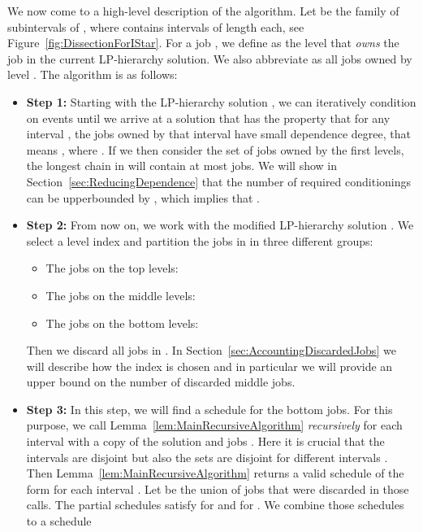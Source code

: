 \documentclass[11pt,letterpaper,oneside,english]{article}
\theoremstyle{theorem}
\begin{document}
We now come to a high-level description of the algorithm. 
Let  be the family of
subintervals of , where  contains  intervals of length 
each, see Figure~\ref{fig:DissectionForIStar}. 
For a job , we define  as the level that \emph{owns} the job in the current LP-hierarchy solution. 
We also abbreviate  as 
all jobs owned by level . The algorithm is as follows:
\begin{itemize}
\item {\bf Step 1:} Starting with the LP-hierarchy solution , we can iteratively condition on events 
until we arrive at a solution 
that has the property that for any interval , the jobs owned by that interval have small dependence degree, that means , where .
If we then consider the set of jobs  
owned by the first  levels, the longest chain in  will contain at most  jobs.
We will show in Section~\ref{sec:ReducingDependence} that the number of required conditionings can be upperbounded by , 
which implies that . \item {\bf Step 2:} From now on, we work with the modified LP-hierarchy solution . We select a 
level index  and partition the jobs in  in three different groups: 
  \begin{itemize}
  \item The jobs on the top levels: 
  \item The jobs on the  middle levels: 
  \item The jobs on the bottom levels: 
  \end{itemize}
Then we discard all jobs in . In Section~\ref{sec:AccountingDiscardedJobs} we will describe how the
index  is chosen and in particular we will provide an upper bound on the number of 
discarded middle jobs. \item {\bf Step 3:} In this step, we will find a schedule for the bottom jobs. 
For this purpose, we call Lemma~\ref{lem:MainRecursiveAlgorithm} \emph{recursively} for each interval  
with a copy of the solution  and jobs . Here it is crucial that the intervals are disjoint but also 
the sets  are disjoint for different intervals .
Then Lemma~\ref{lem:MainRecursiveAlgorithm} returns a valid schedule of the form  for each interval .
Let  be the union of jobs that were discarded
in those calls. The partial schedules  satisfy  for  and 
for . We combine those schedules to a schedule  
 

\end{itemize}
\end{document}

